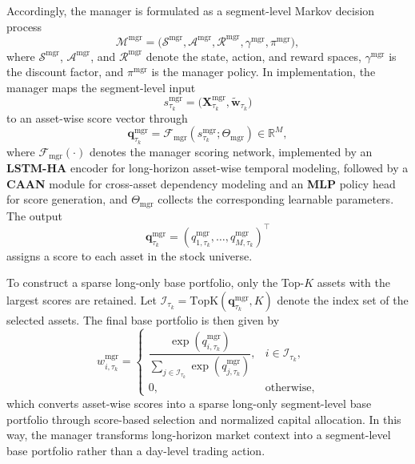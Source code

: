 \documentclass[letterpaper]{article} %
\begin{document}
Accordingly, the manager is formulated as a segment-level Markov decision process
\[
\mathcal{M}^{\mathrm{mgr}}
=
\bigl(
\mathcal{S}^{\mathrm{mgr}},
\mathcal{A}^{\mathrm{mgr}},
\mathcal{R}^{\mathrm{mgr}},
\gamma^{\mathrm{mgr}},
\pi^{\mathrm{mgr}}
\bigr),
\]
where \(\mathcal{S}^{\mathrm{mgr}}\), \(\mathcal{A}^{\mathrm{mgr}}\), and \(\mathcal{R}^{\mathrm{mgr}}\) denote the state, action, and reward spaces, \(\gamma^{\mathrm{mgr}}\) is the discount factor, and \(\pi^{\mathrm{mgr}}\) is the manager policy. In implementation, the manager maps the segment-level input
\[
s_{\tau_k}^{\mathrm{mgr}}
=
\bigl(
\mathbf{X}_{\tau_k}^{\mathrm{mgr}},
\tilde{\mathbf{w}}_{\tau_k}
\bigr)
\]
to an asset-wise score vector through
\[
\mathbf{q}_{\tau_k}^{\mathrm{mgr}}
=
\mathcal{F}_{\mathrm{mgr}}
\!\left(
s_{\tau_k}^{\mathrm{mgr}};
\Theta_{\mathrm{mgr}}
\right)
\in\mathbb{R}^{M},
\]
where \(\mathcal{F}_{\mathrm{mgr}}(\cdot)\) denotes the manager scoring network, implemented by an \textbf{LSTM-HA} \citep{alphastock} encoder for long-horizon asset-wise temporal modeling, followed by a \textbf{CAAN} \citep{alphastock} module for cross-asset dependency modeling and an \textbf{MLP} policy head for score generation, and \(\Theta_{\mathrm{mgr}}\) collects the corresponding learnable parameters. The output
\[
\mathbf{q}_{\tau_k}^{\mathrm{mgr}}
=
(q_{1,\tau_k}^{\mathrm{mgr}},\dots,q_{M,\tau_k}^{\mathrm{mgr}})^\top
\]
assigns a score to each asset in the stock universe.

To construct a sparse long-only base portfolio, only the Top-\(K\) assets with the largest scores are retained. Let \(\mathcal{I}_{\tau_k}=\mathrm{TopK}(\mathbf{q}^{\mathrm{mgr}}_{\tau_k},K)\) denote the index set of the selected assets. The final base portfolio is then given by
\[
w_{i,\tau_k}^{\mathrm{mgr}}
=
\begin{cases}
\dfrac{\exp(q_{i,\tau_k}^{\mathrm{mgr}})}
{\sum_{j\in\mathcal{I}_{\tau_k}}
\exp(q_{j,\tau_k}^{\mathrm{mgr}})},
& i\in\mathcal{I}_{\tau_k},\\[10pt]
0, & \text{otherwise},
\end{cases}
\]
which converts asset-wise scores into a sparse long-only segment-level base portfolio through score-based selection and normalized capital allocation. In this way, the manager transforms long-horizon market context into a segment-level base portfolio rather than a day-level trading action.
\end{document}
